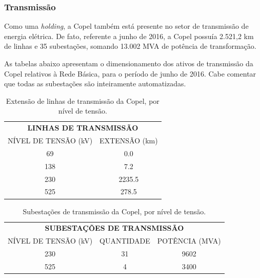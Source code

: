\documentclass[grad,numbers]{coppe}
\begin{document}
  \hypertarget{transmissuxe3o}{%
  \subsubsection{Transmissão}\label{transmissuxe3o}}

  Como uma \emph{holding}, a Copel também está presente no setor de transmissão de energia elétrica. De fato, referente a junho de 2016, a Copel possuía 2.521,2 km de linhas e 35 subestações, somando 13.002 MVA de potência de transformação.

  As tabelas abaixo apresentam o dimensionamento dos ativos de transmissão da Copel relativos à Rede Básica, para o período de junho de 2016. Cabe comentar que todas as subestações são inteiramente automatizadas.
  \begin{table}[H]

  \caption{\label{tab:unnamed-chunk-2}Extensão de linhas de transmissão da Copel, por nível de tensão.}
  \centering
  \begin{tabular}[t]{cc}
  \toprule
  \multicolumn{2}{c}{\textbf{LINHAS DE TRANSMISSÃO}} \\
  \cmidrule(l{3pt}r{3pt}){1-2}
  NÍVEL DE TENSÃO (kV) & EXTENSÃO (km)\\
  \midrule
  69 & 0.0\\
  138 & 7.2\\
  230 & 2235.5\\
  525 & 278.5\\
  \bottomrule
  \end{tabular}
  \end{table}
  \begin{table}[H]

  \caption{\label{tab:unnamed-chunk-3}Subestações de transmissão da Copel, por nível de tensão.}
  \centering
  \begin{tabular}[t]{ccc}
  \toprule
  \multicolumn{3}{c}{\textbf{SUBESTAÇÕES DE TRANSMISSÃO}} \\
  \cmidrule(l{3pt}r{3pt}){1-3}
  NÍVEL DE TENSÃO (kV) & QUANTIDADE & POTÊNCIA (MVA)\\
  \midrule
  230 & 31 & 9602\\
  525 & 4 & 3400\\
  \bottomrule
  \end{tabular}
  \end{table}
  \(\,\)
\end{document}
